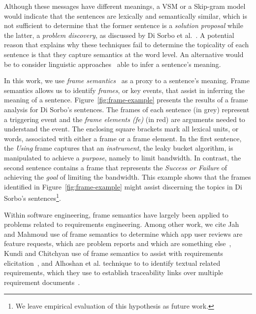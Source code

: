 Although these messages have different meanings, a \acs{VSM} or a Skip-gram model would indicate that the sentences are lexically and semantically similar, which is not sufficient to determine that the former sentence
 is a \textit{solution proposal} while the latter, a \textit{problem discovery}, as discussed by Di Sorbo et al.~\cite{Sorbo2015}. 
A potential reason that explains why these techniques fail to determine the topicality of each sentence is that they capture semantics at the word level. 
An alternative would be to consider linguistic approaches~\cite{ariel2008pragmatics, austin1975pragmatics} able to infer a sentence's meaning.



In this work, we use \textit{frame semantics}~\cite{fillmore1976frame, Baker1998} as a proxy to a sentence's meaning.
Frame semantics allows us to identify \textit{frames},
or key events, that assist in inferring the meaning of a sentence.
Figure~\ref{fig:frame-example} presents the results of a frame
analysis for Di Sorbo's sentences.
The frames of each sentence (in grey) represent a
triggering event and the \textit{frame elements (fe)} (in red) are arguments needed
to understand the event. The enclosing square brackets
mark all lexical units, or words,
associated with either a frame or a frame element.
In the first sentence, the \textit{Using} frame
captures that an \textit{instrument}, the leaky bucket algorithm, is
manipulated to achieve a \textit{purpose}, namely to limit bandwidth.
In contrast, the second sentence contains a frame that represents the \textit{Success or Failure}
of achieving the \textit{goal} of limiting the bandwidth. 
This example shows that the frames identified in Figure~\ref{fig:frame-example} might assist discerning the topics in Di Sorbo's sentences\footnote{We leave empirical evaluation of this hypothesis as future work.}.





Within software engineering, frame semantics have largely been applied to problems related
to requirements engineering.
Among other work, we cite 
Jah and Mahmoud use of frame semantics
to determine which app user reviews are feature requests, which are problem reports and which
are something else~\cite{jha2017},
Kundi and Chitchyan use of frame semantics to assist with requirements
elicitation~\cite{kundi2017}, and Alhoshan et al. technique to 
to identify textual related requirements, which they use to establish traceability links 
over multiple requirement documents~\cite{alhoshan2019using}.


